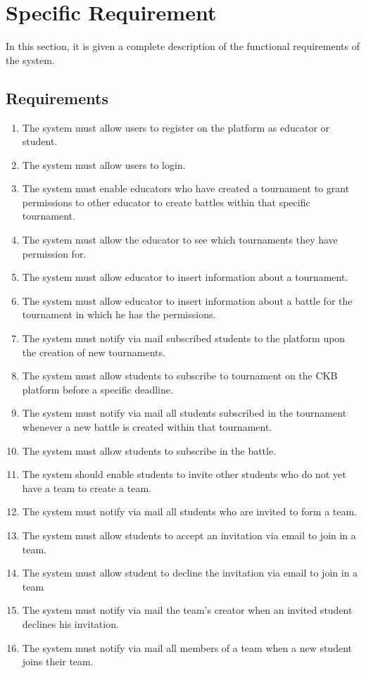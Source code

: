 \section{Specific Requirement}
In this section, it is given a complete description of the functional requirements of the system.
\subsection{Requirements}
\begin{enumerate}[label=\bfseries R\arabic*]
    \item The system must allow  users to register on the platform as educator or student.
    \item The system must allow  users to login.
    \item  The system must enable educators who have created a tournament to grant permissions to other educator  to create battles within that specific tournament.

    
    \item The system must allow the educator to see which tournaments they have permission for.
    \item The system must allow educator to insert information about a tournament.
    \item The system must allow educator to insert information about a battle for the tournament in which he has the permissions.
    
    \item The system must notify via mail subscribed students to the platform upon the creation of new tournaments.
    \item  The system must allow students to subscribe to tournament on the CKB platform before a specific deadline.
    \item  The system must notify via mail  all students subscribed in the tournament whenever a new battle is created within that tournament.

    \item The system must allow students to subscribe in the battle.

    \item The system should enable students to invite other students who do not yet have a team to create a team.
    
    \item The system must notify via mail all students who are invited to form a team.
    \item The system must allow students to accept an invitation via email to join in a team.
    \item The system must allow student to decline the invitation via email to join in a team
    \item The system must notify via mail the team's creator when an invited student declines his invitation.
    \item The system must notify via mail all members of a team when a new student joins their team.


\end{enumerate}

